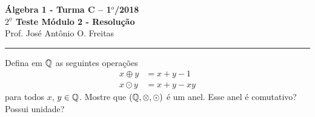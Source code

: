 \documentclass[12pt]{article}
\begin{document}


\begin{center}
{\Large\bf {\'A}lgebra 1 - Turma C -- 1$^{o}$/2018} \\ \vspace{9pt} {\large\bf
  $2^{\underline{o}}$ Teste Módulo 2 - Resolu\c{c}\~ao}\\
\vspace{9pt} Prof. Jos{\'e} Ant{\^o}nio O. Freitas
\end{center}
\hrule

\vspace{.6cm}

\questao Defina em $\mathbb{Q}$ as seguintes operações
\begin{align*}
	x \oplus y &= x + y - 1\\
	x \odot y &= x + y - xy
\end{align*}
para todos $x$, $y \in \mathbb{Q}$. Mostre que $(\mathbb{Q}, \otimes, \odot)$ é um anel. Esse anel é comutativo? Possui unidade?
\end{document}
